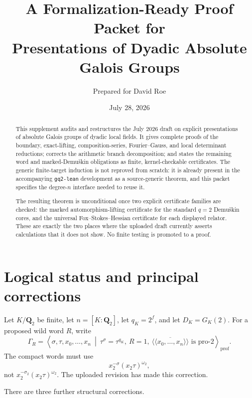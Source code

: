 \documentclass[11pt,reqno]{amsart}
\title[Formalization packet for dyadic presentations]
{A Formalization-Ready Proof Packet for\\
Presentations of Dyadic Absolute Galois Groups}
\author{Prepared for David Roe}
\date{July 28, 2026}
\theoremstyle{remark}
\numberwithin{equation}{section}
\newcommand{\Q}{\mathbf Q}
\newcommand{\prof}{\mathrm{prof}}
\begin{document}
\begin{abstract}
This supplement audits and restructures the July 2026 draft on explicit
presentations of absolute Galois groups of dyadic local fields.  It gives
complete proofs of the boundary, exact-lifting, composition-series,
Fourier--Gauss, and local determinant reductions; corrects the arithmetic
branch decomposition; and states the remaining word and marked-Demu\v{s}kin
obligations as finite, kernel-checkable certificates.  The generic
finite-target induction is not reproved from scratch: it is already present
in the accompanying \texttt{gq2-lean} development as a source-generic theorem,
and this packet specifies the degree-\(n\) interface needed to reuse it.

The resulting theorem is unconditional once two explicit certificate
families are checked: the marked automorphism-lifting certificate for the
standard \(q=2\) Demu\v{s}kin cores, and the universal Fox--Stokes--Hessian
certificate for each displayed relator.  These are exactly the two places
where the uploaded draft currently asserts calculations that it does not
show.  No finite testing is promoted to a proof.
\end{abstract}

\maketitle
\tableofcontents

\section{Logical status and principal corrections}

Let \(K/\Q_2\) be finite, let \(n=[K:\Q_2]\), let \(q_K=2^f\), and let
\(D_K=G_K(2)\).  For a proposed wild word \(R\), write
\[
 \Gamma_R=\left\langle\sigma,\tau,x_0,\ldots,x_n\ \middle|\
 \tau^\sigma=\tau^{q_K},\ R=1,\
 \overline{\langle\!\langle x_0,\ldots,x_n\rangle\!\rangle}
 \text{ is pro-}2\right\rangle_{\prof}.
\]
The compact words must use
\[
 x_2^{-\sigma}(x_2\tau)^{\omega_2},
\]
not \(x_2^{-\sigma_2}(x_2\tau)^{\omega_2}\).  The uploaded revision has
made this correction.

There are three further structural corrections.
\end{document}
